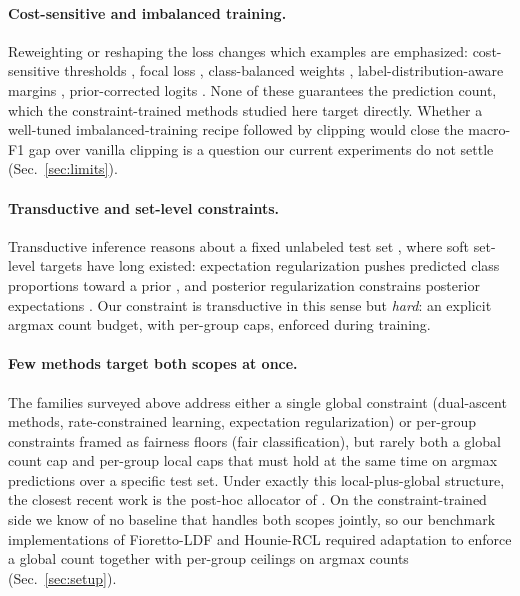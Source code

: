\documentclass[10pt]{article}
\begin{document}
\paragraph{Cost-sensitive and imbalanced training.}
Reweighting or reshaping the loss changes which examples are emphasized:
cost-sensitive thresholds \citep{elkan2001foundations}, focal loss
\citep{lin2017focal}, class-balanced weights \citep{cui2019class},
label-distribution-aware margins \citep{cao2019learning}, prior-corrected
logits \citep{menon2020long}. None of these guarantees the prediction count, which the
constraint-trained methods studied here target directly. Whether a
well-tuned imbalanced-training recipe followed by clipping would close
the macro-F1 gap over vanilla clipping is a question our current
experiments do not settle (Sec.~\ref{sec:limits}).

\paragraph{Transductive and set-level constraints.}
Transductive inference reasons about a fixed unlabeled test set
\citep{vapnik1998statistical,joachims1999transductive}, where soft set-level
targets have long existed: expectation regularization pushes predicted class
proportions toward a prior \citep{mann2007simple}, and posterior
regularization constrains posterior expectations \citep{ganchev2009posterior}.
Our constraint is transductive in this sense but \emph{hard}: an explicit
argmax count budget, with per-group caps, enforced during training.

\paragraph{Few methods target both scopes at once.}
The families surveyed above address either a single global constraint
(dual-ascent methods, rate-constrained learning, expectation
regularization) or per-group constraints framed as fairness floors (fair
classification), but rarely both a global count cap and per-group local
caps that must hold at the same time on argmax predictions over a
specific test set. Under exactly this local-plus-global structure, the
closest recent work is the post-hoc allocator of
\citet{shifman2025classification}. On the constraint-trained side we
know of no baseline that handles both scopes jointly, so our benchmark
implementations of Fioretto-LDF and Hounie-RCL required adaptation to
enforce a global count together with per-group ceilings on argmax
counts (Sec.~\ref{sec:setup}).
\end{document}
